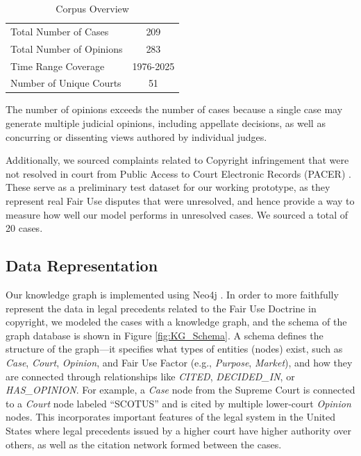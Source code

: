 \begin{table}[h!]
  \centering
  \caption{Corpus Overview}
  \begin{tabular}{lc}
    \toprule
    Total Number of Cases & 209 \\
    Total Number of Opinions & 283 \\
    Time Range Coverage & 1976-2025\\
    Number of Unique Courts & 51 \\
    \bottomrule
  \end{tabular}
\end{table}

The number of opinions exceeds the number of cases because a single case may generate multiple judicial opinions, including appellate decisions, as well as concurring or dissenting views authored by individual judges.

Additionally, we sourced complaints related to Copyright infringement that were not resolved in court from Public Access to Court Electronic Records (PACER) \cite{26_PACER}. These serve as a preliminary test dataset for our working prototype, as they represent real Fair Use disputes that were unresolved, and hence provide a way to measure how well our model performs in unresolved cases. We sourced a total of 20 cases.

\subsection{Data Representation}
\label{sec: data_representation_KG}

Our knowledge graph is implemented using Neo4j \cite{27_neo4j}. In order to more faithfully represent the data in legal precedents related to the Fair Use Doctrine in copyright, we modeled the cases with a knowledge graph, and the schema of the graph database is shown in Figure \ref{fig:KG_Schema}. A schema defines the structure of the graph—it specifies what types of entities (nodes) exist, such as \textit{Case}, \textit{Court}, \textit{Opinion}, and Fair Use Factor (e.g., \textit{Purpose}, \textit{Market}), and how they are connected through relationships like \textit{CITED}, \textit{DECIDED\_IN}, or \textit{HAS\_OPINION}. For example, a \textit{Case} node from the Supreme Court is connected to a \textit{Court} node labeled ``SCOTUS'' and is cited by multiple lower-court \textit{Opinion} nodes.  This incorporates important features of the legal system in the United States where legal precedents issued by a higher court have higher authority over others, as well as the citation network formed between the cases.

